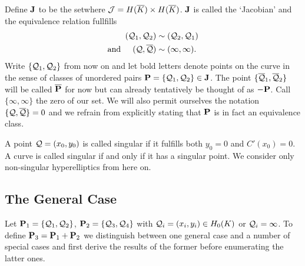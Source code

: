 \documentclass[english,11pt,a4paper]{article}
\begin{document}
\begin{defin}\label{defj}
	Define $\J$ to be the set\scalebox{1.3}{ $\nicefrac{ \j }{\sim }$ }where $\j = \ekb \times \ekb$. $\J$ is called the `Jacobian' and the equivalence relation fullfills
	\begin{align*}
		(\q_1,\q_2) &\sim (\q_2,\q_1) \\
		\text{and\hspace{5mm}} (\q,\bar \q) & \sim ( \infty , \infty ). 
	\end{align*}
	Write $\{ \q_1,\q_2 \}$ from now on and let bold letters denote points on the curve in the sense of classes of unordered pairs $\P =\{ \q_1, \q_2 \} \in \J$. The point $\{ \bar \q_1, \bar \q_2 \}$ will be called $\bar \P$ for now but can already tentatively be thought of as $-\P$. Call $\{ \infty, \infty \}$ the zero of our set. We will also permit ourselves the notation $\{ \q,\bar \q \} = 0$ and we refrain from explicitly stating that $\P$ is in fact an equivalence class.

	A point $\q = (x_0,y_0)$ is called singular if it fulfills both $y_0=0$ and $C'(x_0) = 0$. A curve is called singular if and only if it has a singular point. We consider only non-singular hyperelliptics from here on.
\end{defin}

\subsection{The General Case}

Let $\P_1 = \{\q_1,\q_2\}$, $\P_2 = \{\q_3,\q_4\}$ with $\q_i = (x_i,y_i) \in \enk$ or $\q_i = \infty$. To define $\P_3 = \P_1 + \P_2$ we distinguish between one general case and a number of special cases and first derive the results of the former before enumerating the latter ones.
\end{document}
